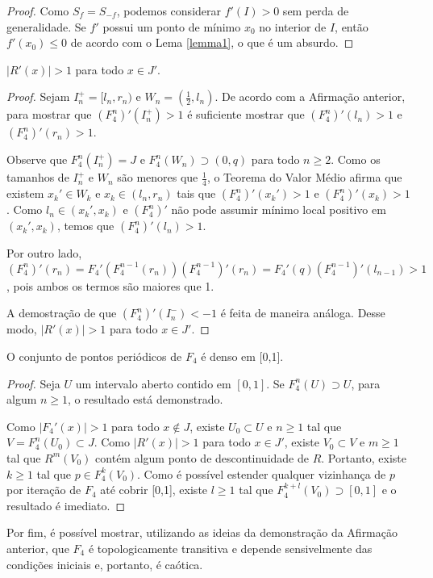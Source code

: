 \begin{proof}
Como $S_f = S_{-f}$, podemos considerar $f'(I) > 0$ sem perda de generalidade. Se $f'$ possui um ponto de mínimo $x_0$ no interior de $I$, então $f'(x_0) \leq 0$ de acordo com o Lema \ref{lemma1}, o que é um absurdo.
\end{proof}

\begin{affirmation}
$|R'(x)| > 1$ para todo $x \in J'$.
\end{affirmation}

\begin{proof}
Sejam $I^+_n = [l_n, r_n)$ e $W_n = (\frac{1}{2}, l_n)$. De acordo com a Afirmação anterior, para mostrar que $(F_4^n)'(I^+_n) > 1$ é suficiente mostrar que $(F_4^n)'(l_n) > 1$ e $(F_4^n)'(r_n) > 1$.

Observe que $F_4^n(I^+_n) = J$ e $F_4^n(W_n) \supset (0,q)$ para todo $n \geq 2$. Como os tamanhos de $I^+_n$ e $W_n$ são menores que $\frac{1}{4}$, o Teorema do Valor Médio afirma que existem $x_k' \in W_k$ e $x_k \in (l_n, r_n)$ tais que $(F_4^n)'(x_k') > 1$ e $(F_4^n)'(x_k) > 1$. Como $l_n \in (x_k', x_k)$ e $(F_4^n)'$ não pode assumir mínimo local positivo em $(x_k',x_k)$, temos que $(F_4^n)'(l_n) > 1$.

Por outro lado, $(F_4^n)'(r_n) = F_4'(F_4^{n-1}(r_n)) (F_4^{n-1})'(r_n) =  F_4'(q) (F_4^{n-1})'(l_{n-1}) > 1$, pois ambos os termos são maiores que 1.

A demostração de que $(F_4^n)'(I^-_n) < -1$ é feita de maneira análoga. Desse modo, $|R'(x)| > 1$ para todo $x \in J'$.
\end{proof}

\begin{affirmation}
O conjunto de pontos periódicos de $F_4$ é denso em [0,1].
\end{affirmation}

\begin{proof}
Seja $U$ um intervalo aberto contido em $[0,1]$. Se $F_4^n(U) \supset U$, para algum $n \geq 1$, o resultado está demonstrado.

Como $|F_4'(x)| > 1$ para todo $x \notin J$, existe $U_0 \subset U$ e $n \geq 1$ tal que $V = F_4^n(U_0) \subset J$. Como $|R'(x)|>1$ para todo $x \in J'$, existe $V_0 \subset V$ e $m \geq 1$ tal que $R^m(V_0)$ contém algum ponto de descontinuidade de $R$. Portanto, existe $k \geq 1$ tal que $p \in F_4^k(V_0)$. Como é possível estender qualquer vizinhança de $p$ por iteração de $F_4$ até cobrir [0,1], existe $l \geq 1$ tal que $F_4^{k+l}(V_0) \supset [0,1]$ e o resultado é imediato.
\end{proof}

Por fim, é possível mostrar, utilizando as ideias da demonstração da Afirmação anterior, que $F_4$ é topologicamente transitiva e depende sensivelmente das condições iniciais e, portanto, é caótica.
